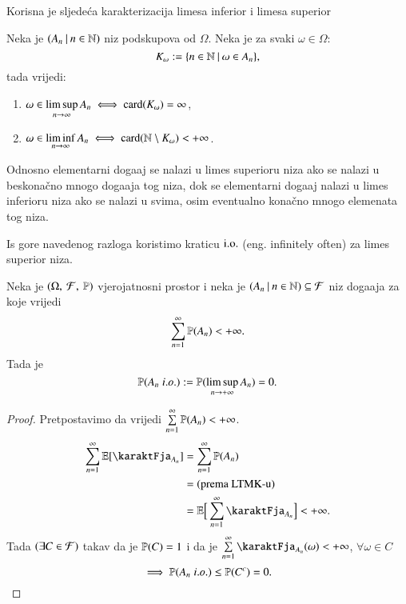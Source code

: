 Korisna je sljede\' ca karakterizacija limesa inferior i limesa superior

\begin{prop}    \label{prop:9.1-2}
    Neka je $({A_n} \: | \: {n \in \mathbb{N}})$ niz podskupova od $\Omega$.
    Neka je za svaki $\omega \in \Omega$:
    \begin{equation*}
        K_\omega := \{{n \in \mathbb{N}} \: | \: {\omega \in A_n}\},
    \end{equation*}
    tada vrijedi:
    \begin{enumerate}[label=(\arabic*)]
        \item $\omega \in \limsup\limits_{n \to \infty} A_n \iff \textnormal{card}({K_\omega}) = \infty$,
        \item $\omega \in \liminf\limits_{n \to \infty} A_n \iff \textnormal{card}({\mathbb{N} \setminus K_\omega}) < +\infty$.
    \end{enumerate}
\end{prop}

Odnosno elementarni doga\dj aj se nalazi u limes superioru niza ako se nalazi u beskona\v cno mnogo doga\dj aja tog niza, dok se elementarni doga\dj aj nalazi u limes inferioru niza ako se nalazi u svima, osim eventualno kona\v cno mnogo elemenata tog niza.

\begin{nap} \label{nap:9.1-3}
    Is gore navedenog razloga koristimo kraticu $\mathrm{i.o.}$ (eng. infinitely often) za limes superior niza.    
\end{nap}

\begin{lm}  \label{lm:9.2}
    Neka je $(\Omega, \: \mathcal{F}, \: \mathbb{P})$ vjerojatnosni prostor i neka je $({A_n} \: | \: {n \in \mathbb{N}}) \subseteq \mathcal{F}$ niz doga\dj aja za koje vrijedi
    \begin{equation*}
        \sum\limits_{n = 1}^{\infty} \mathbb{P}({A_n}) < +\infty.
    \end{equation*}
    Tada je
    \begin{equation*}
        \mathbb{P}({A_n \; i.o.}) := \mathbb{P}({\limsup\limits_{n \to +\infty} A_n}) = 0.
    \end{equation*}
\end{lm}

\begin{proof}
    Pretpostavimo da vrijedi
    $\sum\limits_{n = 1}^{\infty} \mathbb{P}({A_n}) < +\infty$.
    \begin{equation*}
        \begin{aligned}
            \suma{n = 1}{\infty} \masE [ \karaktFja_{A_n} ] &= \suma{n = 1}{\infty} \vjeroj{A_n}\\
            &= (\textnormal{prema LTMK-u})\\
            &= \masE \Big[ \suma{n = 1}{\infty} \karaktFja_{A_n} \Big] < +\infty.
        \end{aligned}
    \end{equation*}
    Tada $(\exists C \in \mathcal{F})$ takav da je $\mathbb{P}({C}) = 1$ i da je $\suma{n = 1}{\infty} \karaktFja_{A_n}(\omega) < +\infty$, $\forall \omega \in C$
    \begin{equation*}
        \implies \mathbb{P}({A_n \; i.o.}) \leq \mathbb{P}({C^c}) = 0. 
    \end{equation*}
\end{proof}

